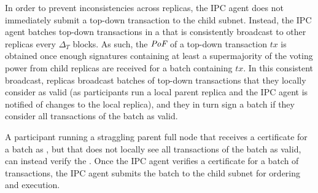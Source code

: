  In order to prevent inconsistencies across replicas, the IPC agent does not immediately submit a top-down transaction to the child subnet. Instead, the IPC agent batches top-down transactions in a \emph{\tcheckpoint} that is consistently broadcast to other replicas every $\Delta_T$ blocks. As such, the $\textit{PoF}$ of a top-down transaction $tx$ is obtained once enough signatures containing at least a supermajority of the voting power from child replicas are received for a batch containing $tx$. In this consistent broadcast, replicas broadcast batches of top-down transactions that they locally consider as valid (as participants run a local parent replica and the IPC agent is notified of changes to the local replica), and they in turn sign a batch if they consider all transactions of the batch as valid. 

A participant running a straggling parent full node that receives a certificate for a batch as \prf, but that does not locally see all transactions of the batch as valid, can instead verify the \prf. Once the IPC agent verifies a certificate for a batch of transactions, the IPC agent submits the batch to the child subnet for ordering and execution. 


